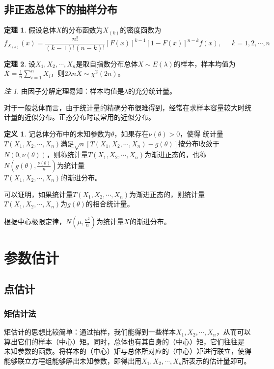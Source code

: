 \documentclass[a4paper,11pt]{article}%
\theoremstyle{remark}
\newtheorem*{remark}{注}
\theoremstyle{remark}
\theoremstyle{definition}
\newtheorem{theorem}{定理}[section]
\theoremstyle{definition}
\newtheorem*{definition}{定义}
\theoremstyle{plain}
\begin{document}
\subsection{非正态总体下的抽样分布}
\begin{theorem}
    假设总体$X$的分布函数为$X_{(k)}$的密度函数为 
    \[f_{X_{(k)}}(x)=\frac{n!}{(k-1)!(n-k)!}[F(x)]^{k-1}[1-F(x)]^{n-k}f(x),\phantom{111}k = 1,2,\cdots,n\]
\end{theorem}
\begin{theorem}
    设$X_1,X_2,\cdots,X_n$是取自指数分布总体$X\sim E(\lambda)$的样本，样本均值为$\overline{X}=\frac{1}{n}\sum_{i=1}^{n}X_i$，则$2\lambda n\overline{X}\sim \chi^2(2n)$。
\end{theorem}
\begin{remark}
    由因子分解定理易知：样本均值是$\lambda$的充分统计量。
\end{remark}
对于一般总体而言，由于统计量的精确分布很难得到，经常在求样本容量较大时统计量的近似分布。正态分布时最常用的近似分布。
\begin{definition}
    记总体分布中的未知参数为$\theta$，如果存在$\nu(\theta)>0$，使得 统计量\\$T(X_1,X_2,\cdots,X_n)$满足$\sqrt{n}[T(X_1,X_2,\cdots,X_n)-g(\theta)]$按分布收敛于$N(0,\nu(\theta))$，则称统计量$T(X_1,X_2,\cdots,X_n)$为渐进正态的，也称$N(g(\theta),\frac{\nu(\theta)}{n})$为统计量\\$T(X_1,X_2,\cdots,X_n)$的渐进分布。
\end{definition}
可以证明，如果统计量$T(X_1,X_2,\cdots,X_n)$为渐进正态的，则统计量\\$T(X_1,X_2,\cdots,X_n)$为$g(\theta)$的相合统计量。

根据中心极限定律，$N(\mu,\frac{\sigma^2}{n})$为统计量$\overline{X}$的渐进分布。
\section{参数估计}
\subsection{点估计}
\subsubsection{矩估计法}
矩估计的思想比较简单：通过抽样，我们能得到一些样本$X_1,X_2,\cdots,X_n$，从而可以算出它们的样本（中心）矩。同时，总体也有其自身的（中心）矩，它们往往是
未知参数的函数。将样本的（中心）矩与总体所对应的（中心）矩进行联立，使得能够联立方程组能够解出未知参数，即得出用$X_1,X_2,\cdots,X_n$所表示的估计量即可。
\end{document}
